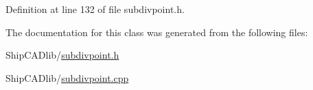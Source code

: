 Definition at line 132 of file subdivpoint.\-h.



The documentation for this class was generated from the following files\-:\begin{DoxyCompactItemize}
\item 
Ship\-C\-A\-Dlib/\hyperlink{subdivpoint_8h}{subdivpoint.\-h}\item 
Ship\-C\-A\-Dlib/\hyperlink{subdivpoint_8cpp}{subdivpoint.\-cpp}\end{DoxyCompactItemize}

